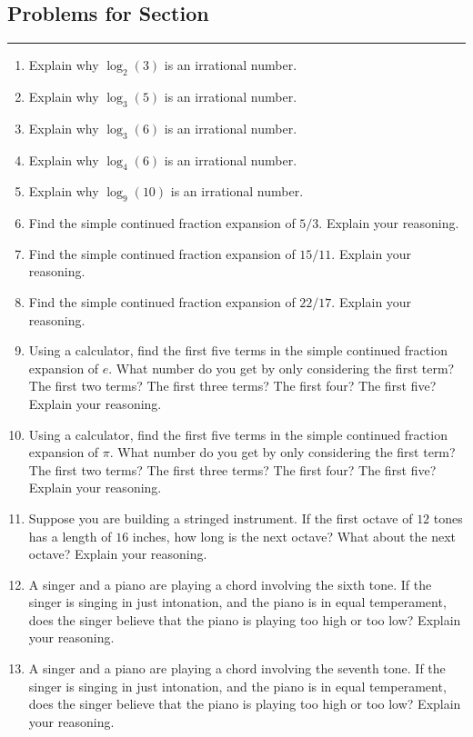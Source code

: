 \subsection*{Problems for Section \thesection}\hrule\vspace{1ex}
\begin{enumerate}
\item Explain why $\log_2(3)$ is an irrational number.
\item Explain why $\log_3(5)$ is an irrational number.
\item Explain why $\log_3(6)$ is an irrational number.
\item Explain why $\log_4(6)$ is an irrational number.
\item Explain why $\log_9(10)$ is an irrational number.
\item Find the simple continued fraction expansion of $5/3$. Explain
  your reasoning.
\item Find the simple continued fraction expansion of $15/11$. Explain
  your reasoning.
\item Find the simple continued fraction expansion of $22/17$. Explain
  your reasoning.
\item Using a calculator, find the first five terms in the simple
  continued fraction expansion of $e$. What number do you get by only
  considering the first term? The first two terms? The first three
  terms? The first four? The first five?  Explain your reasoning.
\item Using a calculator, find the first five terms in the simple
  continued fraction expansion of $\pi$. What number do you get by
  only considering the first term? The first two terms? The first
  three terms? The first four? The first five?  Explain your
  reasoning.
\item Suppose you are building a stringed instrument. If the first
  octave of $12$ tones has a length of $16$ inches, how long is the
  next octave? What about the next octave? Explain your reasoning.
\item A singer and a piano are playing a chord involving the sixth
  tone. If the singer is singing in just intonation, and the piano is
  in equal temperament, does the singer believe that the piano is
  playing too high or too low? Explain your reasoning.
\item A singer and a piano are playing a chord involving the seventh
  tone. If the singer is singing in just intonation, and the piano is
  in equal temperament, does the singer believe that the piano is
  playing too high or too low? Explain your reasoning.

\end{enumerate}
